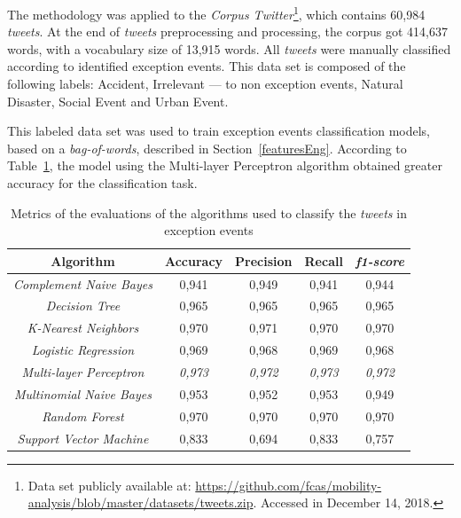 \documentclass[runningheads]{llncs}
\begin{document}
The methodology was applied to the \textit{Corpus Twitter}\footnote{Data set publicly available at: \url{https://github.com/fcas/mobility-analysis/blob/master/datasets/tweets.zip}. Accessed in December 14, 2018.}, which contains 60,984 \textit{tweets}. At the end of \textit{tweets} preprocessing and processing, the corpus got 414,637 words, with a vocabulary size of 13,915 words. All \textit{tweets} were manually classified according to identified exception events. This data set is composed of the following labels: Accident, Irrelevant --- to non exception events, Natural Disaster, Social Event and Urban Event.
 


This labeled data set was used to train exception events classification models, based on a \textit{bag-of-words}, described in Section~\ref{featuresEng}. According to Table~\ref{tab:metrics}, the model using the Multi-layer Perceptron algorithm obtained greater accuracy for the classification task. 


\begin{table}[!htb]
\centering
\caption {Metrics of the evaluations of the algorithms used to classify the \textit {tweets} in exception events}
\label {tab:metrics}
\begin{tabular}{c|c|c|c|c}
\toprule
\textbf{Algorithm} & \textbf{Accuracy} & \textbf{Precision} & \textbf{Recall} & \textbf{\textit{f1-score}} \\
\midrule
\textit{Complement Naive Bayes} & 0,941 & 0,949 & 0,941 & 0,944 \\
\hline
\textit{Decision Tree} & 0,965 & 0,965 & 0,965 & 0,965 \\
\hline
\textit{K-Nearest Neighbors} & 0,970 & 0,971 & 0,970 & 0,970 \\
\hline
\textit{Logistic Regression} & 0,969 & 0,968 & 0,969 & 0,968 \\
\hline
\textit{Multi-layer Perceptron} & \textit{0,973} & \textit{0,972} & \textit{0,973} & \textit{0,972} \\
\hline
\textit{Multinomial Naive Bayes} & 0,953 & 0,952 & 0,953 & 0,949 \\
\hline
\textit{Random Forest} & 0,970 & 0,970 & 0,970 & 0,970 \\
\hline
\textit{Support Vector Machine} & 0,833 & 0,694 & 0,833 & 0,757 \\
\bottomrule
\end{tabular}
\end{table}
\end{document}
